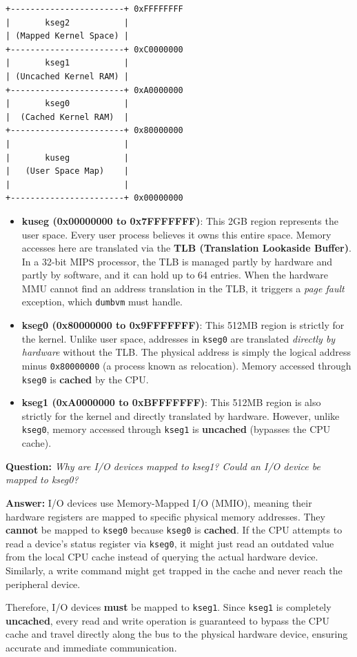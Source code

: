 \begin{verbatim}
+-----------------------+ 0xFFFFFFFF
|       kseg2           |
| (Mapped Kernel Space) |
+-----------------------+ 0xC0000000
|       kseg1           |
| (Uncached Kernel RAM) |
+-----------------------+ 0xA0000000
|       kseg0           |
|  (Cached Kernel RAM)  |
+-----------------------+ 0x80000000
|                       |
|       kuseg           |
|   (User Space Map)    |
|                       |
+-----------------------+ 0x00000000
\end{verbatim}

\begin{itemize}
    \item \textbf{kuseg (0x00000000 to 0x7FFFFFFF)}: This 2GB region represents the user space. Every user process believes it owns this entire space. Memory accesses here are translated via the \textbf{TLB (Translation Lookaside Buffer)}. In a 32-bit MIPS processor, the TLB is managed partly by hardware and partly by software, and it can hold up to 64 entries. When the hardware MMU cannot find an address translation in the TLB, it triggers a \textit{page fault} exception, which \texttt{dumbvm} must handle.
    \item \textbf{kseg0 (0x80000000 to 0x9FFFFFFF)}: This 512MB region is strictly for the kernel. Unlike user space, addresses in \texttt{kseg0} are translated \textit{directly by hardware} without the TLB. The physical address is simply the logical address minus \texttt{0x80000000} (a process known as relocation). Memory accessed through \texttt{kseg0} is \textbf{cached} by the CPU.
    \item \textbf{kseg1 (0xA0000000 to 0xBFFFFFFF)}: This 512MB region is also strictly for the kernel and directly translated by hardware. However, unlike \texttt{kseg0}, memory accessed through \texttt{kseg1} is \textbf{uncached} (bypasses the CPU cache).
\end{itemize}

\begin{tcolorbox}[colback=blue!5!white,colframe=blue!75!black,title=Exam Insight: I/O Devices and kseg1]
\textbf{Question:} \textit{Why are I/O devices mapped to kseg1? Could an I/O device be mapped to kseg0?}

\textbf{Answer:} I/O devices use Memory-Mapped I/O (MMIO), meaning their hardware registers are mapped to specific physical memory addresses. They \textbf{cannot} be mapped to \texttt{kseg0} because \texttt{kseg0} is \textbf{cached}. If the CPU attempts to read a device's status register via \texttt{kseg0}, it might just read an outdated value from the local CPU cache instead of querying the actual hardware device. Similarly, a write command might get trapped in the cache and never reach the peripheral device. 

Therefore, I/O devices \textbf{must} be mapped to \texttt{kseg1}. Since \texttt{kseg1} is completely \textbf{uncached}, every read and write operation is guaranteed to bypass the CPU cache and travel directly along the bus to the physical hardware device, ensuring accurate and immediate communication.
\end{tcolorbox}


